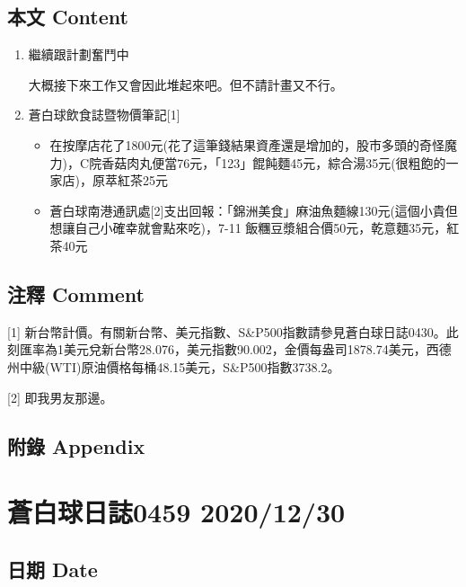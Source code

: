 \documentclass[
]{article}
\providecommand{\tightlist}{%
  \setlength{\itemsep}{0pt}\setlength{\parskip}{0pt}}
\begin{document}
\hypertarget{ux672cux6587-content-28}{%
\subsection{本文 Content}\label{ux672cux6587-content-28}}

\begin{enumerate}
\def\labelenumi{\arabic{enumi}.}
\item
  繼續跟計劃奮鬥中

  大概接下來工作又會因此堆起來吧。但不請計畫又不行。
\item
  蒼白球飲食誌暨物價筆記{[}1{]}

  \begin{itemize}
  \tightlist
  \item
    在按摩店花了1800元(花了這筆錢結果資產還是增加的，股市多頭的奇怪魔力)，C院香菇肉丸便當76元，「123」餛飩麵45元，綜合湯35元(很粗飽的一家店)，原萃紅茶25元
  \item
    蒼白球南港通訊處{[}2{]}支出回報：「錦洲美食」麻油魚麵線130元(這個小貴但想讓自己小確幸就會點來吃)，7-11
    飯糰豆漿組合價50元，乾意麵35元，紅茶40元
  \end{itemize}
\end{enumerate}

\hypertarget{ux6ce8ux91cb-comment-28}{%
\subsection{注釋 Comment}\label{ux6ce8ux91cb-comment-28}}

{[}1{]}
新台幣計價。有關新台幣、美元指數、S\&P500指數請參見蒼白球日誌0430。此刻匯率為1美元兌新台幣28.076，美元指數90.002，金價每盎司1878.74美元，西德州中級(WTI)原油價格每桶48.15美元，S\&P500指數3738.2。

{[}2{]} 即我男友那邊。

\hypertarget{ux9644ux9304-appendix-28}{%
\subsection{附錄 Appendix}\label{ux9644ux9304-appendix-28}}

\hypertarget{ux84bcux767dux7403ux65e5ux8a8c0459-20201230}{%
\section{蒼白球日誌0459
2020/12/30}\label{ux84bcux767dux7403ux65e5ux8a8c0459-20201230}}

\hypertarget{ux65e5ux671f-date-29}{%
\subsection{日期 Date}\label{ux65e5ux671f-date-29}}
\end{document}
